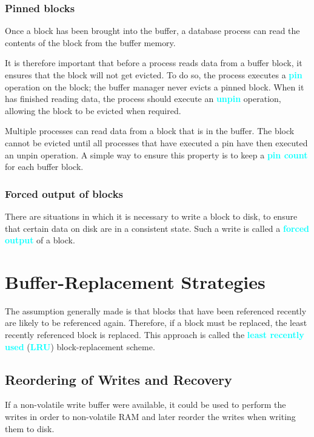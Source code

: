 \documentclass[a4paper,12pt,twoside,openany]{book}
\newcommand{\textcy}[1]{\textbf{\textcolor{cyan}{#1}}}
\begin{document}
\subsubsection{Pinned blocks}

Once a block has been brought into the buffer, a database process can read the contents of the block from the buffer memory.

It is therefore important that before a process reads data from a buffer block, it ensures that the block will not get evicted. To do so, the process executes a \textcy{pin} operation on the block; the buffer manager never evicts a pinned block. When it has finished reading data, the process should execute an \textcy{unpin} operation, allowing the block to be evicted when required.

Multiple processes can read data from a block that is in the buffer. The block cannot be evicted until all processes that have executed a pin have then executed an unpin operation. A simple way to ensure this property is to keep a \textcy{pin count} for each buffer block.

\subsubsection{Forced output of blocks}

There are situations in which it is necessary to write a block to disk, to ensure that certain data on disk are in a consistent state. Such a write is called a \textcy{forced output} of a block.

\section{Buffer-Replacement Strategies}

The assumption generally made is that blocks that have been referenced recently are likely to be referenced again. Therefore, if a block must be replaced, the least recently referenced block is replaced. This approach is called the \textcy{least recently used} (\textcy{LRU}) block-replacement scheme.

\subsection{Reordering of Writes and Recovery}

If a non-volatile write buffer were available, it could be used to perform the writes in order to non-volatile RAM and later reorder the writes when writing them to disk.
\end{document}
